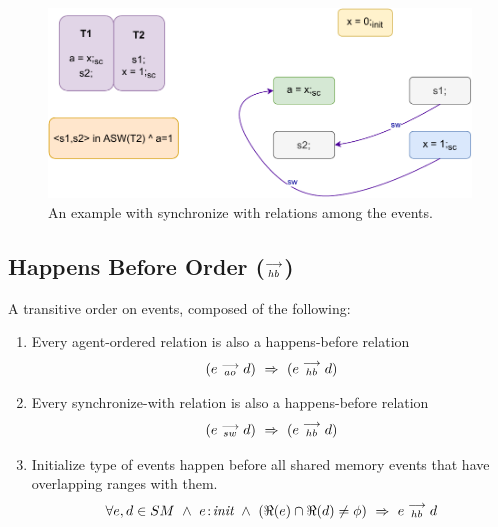         \begin{figure}[H]
            \centering
            \includegraphics[scale=0.7]{4.ECMAScriptMemoryModel/SynchronizeWith.pdf}
            \caption{An example with synchronize with relations among the events.}
        \end{figure}

        
    \subsection{Happens Before Order ($\stackrel{\longrightarrow}{_{hb}}$)}
        A transitive order on events, composed of the following:
        
        \begin{enumerate}
            \item Every agent-ordered relation is also a happens-before relation 
                \begin{align*}
                    (\reln{e}{ao}{d}) \ \Rightarrow{} \ (\reln{e}{hb}{d})    
                \end{align*}
                
            \item Every synchronize-with relation is also a happens-before relation 
                \begin{align*}
                    (\reln{e}{sw}{d}) \ \Rightarrow{} \ (\reln{e}{hb}{d})    
                \end{align*}
                 
            \item Initialize type of events happen before all shared memory events that have overlapping ranges with them. 
                \begin{align*}
                    \forall e,d \in SM \ \wedge \ 
                    \et{e}{init} \ \wedge \ 
                    (\Re(e) \cap \Re(d) \neq \phi)
                    \ \Rightarrow{} \ 
                    \reln{e}{hb}{d}
                \end{align*}          
        \end{enumerate}
    
